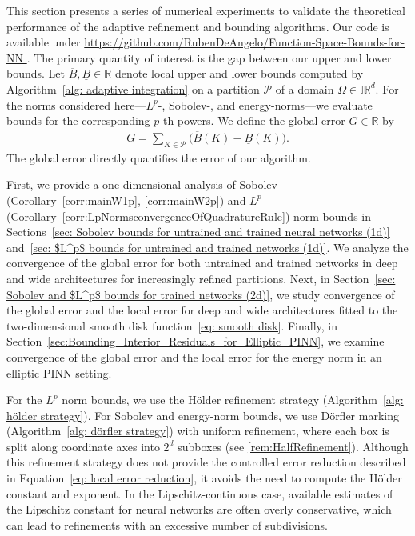 \documentclass[a4paper, 11pt]{article}
\begin{document}
	This section presents a series of numerical experiments to validate the theoretical performance of the adaptive refinement and bounding algorithms. Our code is available under \url{https://github.com/RubenDeAngelo/Function-Space-Bounds-for-NN }.
	The primary quantity of interest is the gap between our upper and lower bounds.
	Let $\overline{B}, \underline{B} \in \mathbb{R}$ denote local upper and lower bounds computed by Algorithm~\ref{alg: adaptive integration} on a partition $\mathcal{P}$ of a domain $\Omega \in \mathbb{IR}^d$.
	For the norms considered here---$L^p$-, Sobolev-, and energy-norms---we evaluate bounds for the corresponding $p$-th powers.
	We define the global error $G \in \mathbb{R}$ by
	\begin{align*}
		G = \sum_{K \in \mathcal{P}} \big(\overline{B}(K) - \underline{B}(K)\big).
	\end{align*}
	The global error directly quantifies the error of our algorithm. 
	
	First, we provide a one-dimensional analysis of Sobolev (Corollary~\ref{corr:mainW1p}, \ref{corr:mainW2p}) and $L^p$ (Corollary~\ref{corr:LpNormsconvergenceOfQuadratureRule}) norm bounds in Sections~\ref{sec: Sobolev bounds for untrained and trained neural networks (1d)} and~\ref{sec: $L^p$ bounds for untrained and trained networks (1d)}.
	We analyze the convergence of the global error for both untrained and trained networks in deep and wide architectures for increasingly refined partitions.
	Next, in Section~\ref{sec: Sobolev and $L^p$ bounds for trained networks (2d)}, we study convergence of the global error and the local error for deep and wide architectures fitted to the two-dimensional smooth disk function~\eqref{eq: smooth disk}.
	Finally, in Section~\ref{sec:Bounding_Interior_Residuals_for_Elliptic_PINN}, we examine convergence of the global error and the local error for the energy norm in an elliptic PINN setting.
	
	For the $L^p$ norm bounds, we use the Hölder refinement strategy (Algorithm~\ref{alg: hölder strategy}). For Sobolev and energy-norm bounds, we use Dörfler marking (Algorithm~\ref{alg: dörfler strategy}) with uniform refinement, where each box is split along coordinate axes into $2^d$ subboxes (see \ref{rem:HalfRefinement}). Although this refinement strategy does not provide the controlled error reduction described in Equation~\eqref{eq: local error reduction}, it avoids the need to compute the Hölder constant and exponent. In the Lipschitz-continuous case, available estimates of the Lipschitz constant for neural networks are often overly conservative, which can lead to refinements with an excessive number of subdivisions.
	
\end{document}

